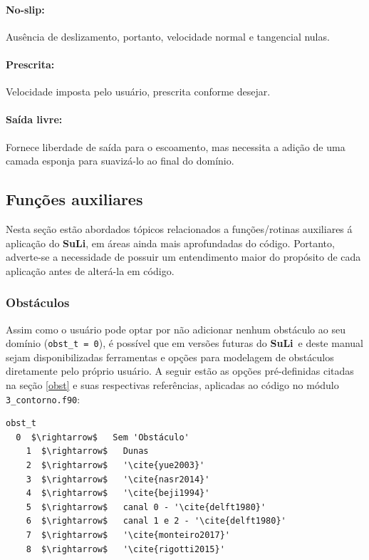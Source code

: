\documentclass[12pt, a4paper]{article}
\newcommand{\SL}{{\bf SuLi}}
\begin{document}
\paragraph{No-slip:} Ausência de deslizamento, portanto, velocidade normal e tangencial nulas.
\paragraph{Prescrita:} Velocidade imposta pelo usuário, prescrita conforme desejar.
\paragraph{Saída livre:} Fornece liberdade de saída para o escoamento, mas necessita a adição de uma camada esponja para suavizá-lo ao final do domínio.




\subsection{Funções auxiliares}
Nesta seção estão abordados tópicos relacionados a funções/rotinas auxiliares á aplicação do \SL, em áreas ainda mais aprofundadas do código. Portanto, adverte-se a necessidade de possuir um entendimento maior do propósito de cada aplicação antes de alterá-la em código.

\subsubsection{Obstáculos} \label{met_num}
Assim como o usuário pode optar por não adicionar nenhum obstáculo ao seu domínio (\verb|obst_t = 0|), é possível que em versões futuras do \SL\ e deste manual sejam disponibilizadas ferramentas e opções para modelagem de obstáculos diretamente pelo próprio usuário. A seguir estão as opções pré-definidas citadas na seção \ref{obst} e suas respectivas referências, aplicadas ao código no módulo \verb|3_contorno.f90|:

\begin{lstlisting}[escapeinside='']
obst_t	
  0  $\rightarrow$   Sem 'Obstáculo'
	1  $\rightarrow$   Dunas
	2  $\rightarrow$   '\cite{yue2003}'
	3  $\rightarrow$   '\cite{nasr2014}'
	4  $\rightarrow$   '\cite{beji1994}'
	5  $\rightarrow$   canal 0 - '\cite{delft1980}'
	6  $\rightarrow$   canal 1 e 2 - '\cite{delft1980}'
	7  $\rightarrow$   '\cite{monteiro2017}'
	8  $\rightarrow$   '\cite{rigotti2015}'
\end{lstlisting}
\end{document}
